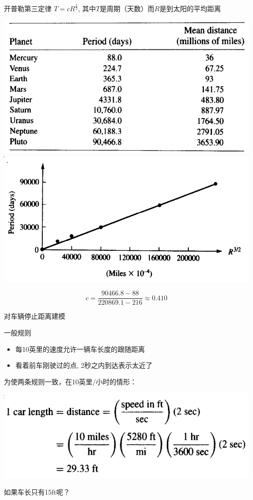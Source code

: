 \documentclass[mathserif]{beamer}
\begin{document}
\begin{frame}{开普勒第三定律}
  $T=cR^{\frac{3}{2}}$, 其中$T$是周期（天数）而$R$是到太阳的平均距离

  \begin{center}
    \includegraphics[width=.45\textwidth{}]{keplertable.png}
    \includegraphics[width=.45\textwidth{}]{keplerfig.png}
  \end{center}

  \[
  c = \frac{90466.8-88}{220869.1-216} \approx 0.410
  \]
  
\end{frame}

\begin{frame}{对车辆停止距离建模}
  \begin{block}{一般规则}
    \begin{itemize}
    \item 每10英里的速度允许一辆车长度的跟随距离
    \item 看着前车刚驶过的点, 2秒之内到达表示太近了
    \end{itemize}
  \end{block}

  为使两条规则一致，在10英里/小时的情形：

  \begin{center}
    \includegraphics[width=.6\textwidth{}]{carformula.png}
  \end{center}

  如果车长只有15ft呢？

\end{frame}
\end{document}
